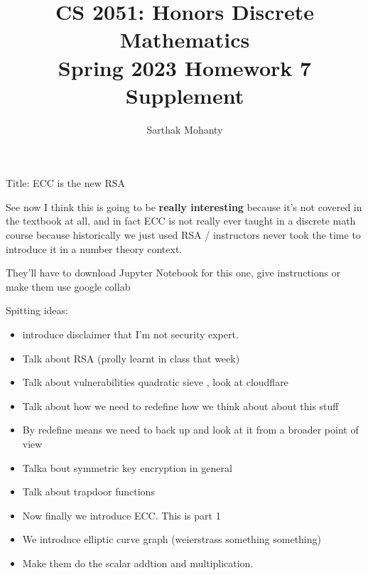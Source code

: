 \documentclass{article}
\title{\vspace{-1cm}CS 2051: Honors Discrete Mathematics \\Spring 2023 Homework 7 Supplement}
\author{Sarthak Mohanty }
\date{}
\begin{document}
\maketitle


Title: ECC is the new RSA

See now I think this is going to be \textbf{really interesting} because it's not covered in the textbook at all, and in fact ECC is not really ever taught in a discrete math course because historically we just used RSA / instructors never took the time to introduce it in a number theory context.

They'll have to download Jupyter Notebook for this one, give instructions or make them use google collab


Spitting ideas:

\begin{itemize}
    \item introduce disclaimer that I'm not security expert.
    \item Talk about RSA (prolly learnt in class that week)
    \item Talk about vulnerabilities quadratic sieve , look at cloudflare
    
    \item Talk about how we need to redefine how we think about about this stuff
    \item By redefine means we need to back up and look at it from a broader point of view
    \item Talka bout symmetric key encryption in general
    \item Talk about trapdoor functions


    \item Now finally we introduce ECC. This is part 1
    \item We introduce elliptic curve graph (weierstrass something something)
    \item Make them do the scalar addtion and multiplication.


\end{itemize}
\end{document}
